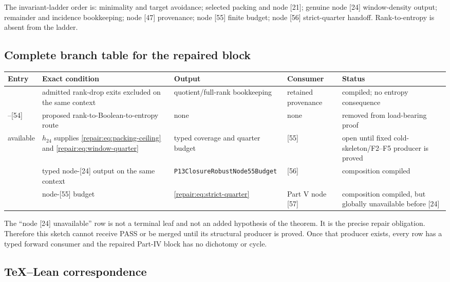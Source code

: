 The invariant-ladder order is: minimality and target avoidance; selected
packing and node [21]; genuine node [24] window-density output; remainder and
incidence bookkeeping; node [47] provenance; node [55] finite budget; node
[56] strict-quarter handoff.  Rank-to-entropy is absent from the ladder.

\subsection*{Complete branch table for the repaired block}

\begin{center}
\begin{tabular}{p{}p{}p{}p{}p{}}
Entry & Exact condition & Output & Consumer & Status \\
\midrule
[47] & admitted rank-drop exits excluded on the same context & quotient/full-rank bookkeeping & retained provenance & compiled; no entropy consequence \\
[48]--[54] & proposed rank-to-Boolean-to-entropy route & none & none & removed from load-bearing proof \\
[24] available & $h_{24}$ supplies \eqref{repair:eq:packing-ceiling} and \eqref{repair:eq:window-quarter} & typed coverage and quarter budget & [55] & open until fixed cold-skeleton/F2--F5 producer is proved \\
[55] & typed node-[24] output on the same context & \texttt{P13ClosureRobustNode55Budget} & [56] & composition compiled \\
[56] & node-[55] budget & \eqref{repair:eq:strict-quarter} & Part V node [57] & composition compiled, but globally unavailable before [24] \\
\end{tabular}
\end{center}

The ``node [24] unavailable'' row is not a terminal leaf and not an added
hypothesis of the theorem.  It is the precise repair obligation.  Therefore
this sketch cannot receive PASS or be merged until its structural producer is
proved.  Once that producer exists, every row has a typed forward consumer and
the repaired Part-IV block has no dichotomy or cycle.

\subsection*{TeX--Lean correspondence}

